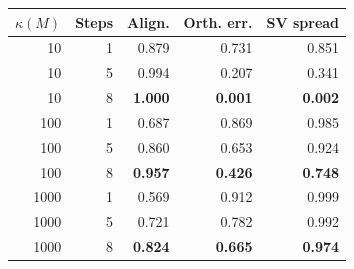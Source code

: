 \footnotesize
\begin{tabular}{rrrrr}
\toprule
$\kappa(M)$ & Steps & Align. & Orth. err. & SV spread \\
\midrule
10 & 1 & 0.879 & 0.731 & 0.851 \\
10 & 5 & 0.994 & 0.207 & 0.341 \\
10 & 8 & \textbf{1.000} & \textbf{0.001} & \textbf{0.002} \\
100 & 1 & 0.687 & 0.869 & 0.985 \\
100 & 5 & 0.860 & 0.653 & 0.924 \\
100 & 8 & \textbf{0.957} & \textbf{0.426} & \textbf{0.748} \\
1000 & 1 & 0.569 & 0.912 & 0.999 \\
1000 & 5 & 0.721 & 0.782 & 0.992 \\
1000 & 8 & \textbf{0.824} & \textbf{0.665} & \textbf{0.974} \\
\bottomrule
\end{tabular}
